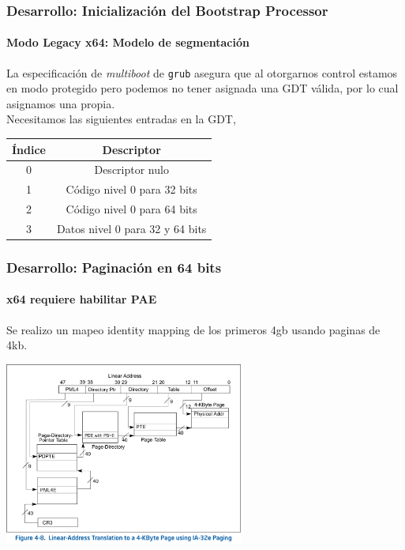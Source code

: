 \documentclass{beamer}
\begin{document}
\begin{frame}
  \frametitle{Desarrollo: Inicialización del Bootstrap Processor} %
  \framesubtitle{Modo Legacy x64: Modelo de segmentación}
  \small
  La especificación de \emph{multiboot} de \texttt{grub} asegura que al otorgarnos control estamos en modo protegido pero podemos no tener asignada una GDT válida, por lo cual asignamos una propia.\\
  \vspace{0.5cm}
  Necesitamos las siguientes entradas en la GDT,
  \vspace{0.5cm}
  \begin{center}
  \begin{tabular}{|c|c|}
  \hline
  Índice & Descriptor\\
  \hline
  0 & Descriptor nulo\\
  \hline
  1 & Código nivel 0 para 32 bits\\
  \hline
  2 & Código nivel 0 para 64 bits\\
  \hline
  3 & Datos nivel 0 para 32 y 64 bits\\
  \hline
  \end{tabular}
  \end{center}
\end{frame}

\begin{frame}
  \frametitle{Desarrollo: Paginación en 64 bits}
  \framesubtitle{x64 requiere habilitar PAE}
  Se realizo un mapeo identity mapping de los primeros 4gb usando paginas de 4kb.
  \begin{center}
  \includegraphics[height=6cm]{images/ia32-paging-overview_INTEL.png} 
  \end{center}
\end{frame}
\end{document}
